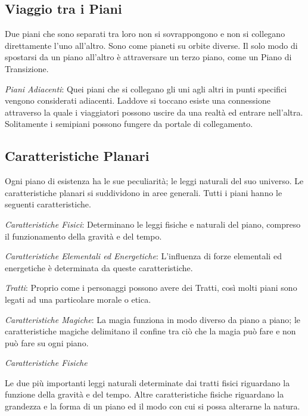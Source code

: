 \documentclass[a4paper,twoside,openany]{book}
\begin{document}
\begin{multicols}{2}
\subsection{Viaggio tra i Piani}
Due piani che sono separati tra loro non si sovrappongono e non si collegano direttamente l'uno all'altro. Sono come pianeti su orbite diverse. Il solo modo di spostarsi da un piano all'altro è attraversare un terzo piano, come un Piano di Transizione.

\emph{Piani Adiacenti}: Quei piani che si collegano gli uni agli altri in punti specifici vengono considerati adiacenti. Laddove si toccano esiste una connessione attraverso la quale i viaggiatori possono uscire da una realtà ed entrare nell'altra. Solitamente i semipiani possono fungere da portale di collegamento.

\subsection{Caratteristiche Planari}
Ogni piano di esistenza ha le sue peculiarità; le leggi naturali del suo universo. Le caratteristiche planari si suddividono in aree generali. Tutti i piani hanno le seguenti caratteristiche.

\emph{Caratteristiche Fisici}: Determinano le leggi fisiche e naturali del piano, compreso il funzionamento della gravità e del tempo.

\emph{Caratteristiche Elementali ed Energetiche}: L'influenza di forze elementali ed energetiche è determinata da queste caratteristiche.

\emph{Tratti}: Proprio come i personaggi possono avere dei Tratti, così molti piani sono legati ad una particolare morale o etica.

\emph{Caratteristiche Magiche}: La magia funziona in modo diverso da piano a piano; le caratteristiche magiche delimitano il confine tra ciò che la magia può fare e non può fare su ogni piano.

\emph{Caratteristiche Fisiche}

Le due più importanti leggi naturali determinate dai tratti fisici riguardano la funzione della gravità e del tempo. Altre caratteristiche fisiche riguardano la grandezza e la forma di un piano ed il modo con cui si possa alterarne la natura.

\medskip


\end{multicols}
\end{document}
